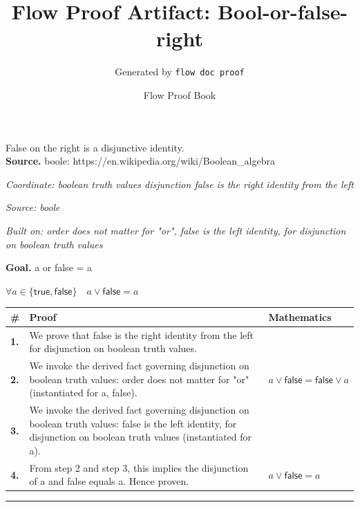 \documentclass[11pt]{article}
\title{Flow Proof Artifact: Bool-or-false-right}
\author{Generated by \texttt{flow doc proof}}
\date{Flow Proof Book}
\theoremstyle{definition}
\begin{document}
\maketitle
False on the right is a disjunctive identity.\\[0.5em]
\textbf{Source.} boole: https://en.wikipedia.org/wiki/Boolean\_algebra\\[0.5em]
\bigskip
{}\par
\smallskip\noindent\textit{Coordinate: boolean truth values \cdot disjunction \cdot false is the right identity from the left}\par
\smallskip\noindent\textit{Source: boole}\par
\smallskip\noindent\textit{Built on: order does not matter for "or", false is the left identity, for disjunction on boolean truth values}\par
\medskip
\noindent\textbf{Goal.} a or false = a\par
\noindent$\displaystyle \forall a \in \{\mathsf{true}, \mathsf{false}\}\quad a \lor \mathsf{false} = a$\par
\medskip
\noindent
\begin{tabular}{@{} >{\raggedright\arraybackslash}p{} >{\raggedright\arraybackslash}p{} >{\raggedleft\arraybackslash}p{} @{}}
\textbf{\#} & \textbf{Proof} & \textbf{Mathematics} \\
\midrule
\textbf{1.} & We prove that false is the right identity from the left for disjunction on boolean truth values. & \\[0.45em]
\textbf{2.} & We invoke the derived fact governing disjunction on boolean truth values: order does not matter for "or" (instantiated for a, false). & $\displaystyle a \lor \mathsf{false} = \mathsf{false} \lor a$ \\[0.45em]
\textbf{3.} & We invoke the derived fact governing disjunction on boolean truth values: false is the left identity, for disjunction on boolean truth values (instantiated for a). & \\[0.45em]
\textbf{4.} & From step 2 and step 3, this implies the disjunction of a and false equals a. Hence proven. & $\displaystyle a \lor \mathsf{false} = a$ \\[0.45em]
\bottomrule
\end{tabular}
\label{thm:Bool-disjunction-false_is_the_right_identity_from_the_left}
\par\medskip\hrule
\end{document}
